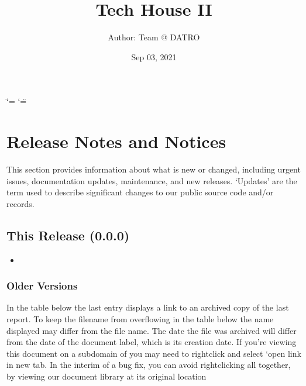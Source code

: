 \documentclass[letterpaper,10pt,openany,oneside,english]{sphinxmanual}
\title{Tech House II}
\date{Sep 03, 2021}
\author{Author: Team @ DATRO}
\begin{document}
\ifdefined\shorthandoff
  \ifnum\catcode`\=\string=\active\shorthandoff{=}\fi
  \ifnum\catcode`\"=\active{}\fi
\fi

\pagestyle{empty}
\sphinxmaketitle
\pagestyle{plain}
\sphinxtableofcontents
\pagestyle{normal}
\label{\detokenize{index::doc}}





\chapter{Release Notes and Notices}
\label{\detokenize{releasenotes:release-notes-and-notices}}\label{\detokenize{releasenotes::doc}}
\sphinxAtStartPar
This section provides information about what is new or changed, including urgent issues, documentation updates, maintenance, and new releases.
\sphinxhyphen{} ‘Updates’ are the term used to describe significant changes to our public source code and/or records.


\section{This Release (0.0.0)}
\label{\detokenize{releasenotes:this-release-0-0-0}}\begin{itemize}
\item {} 
\sphinxAtStartPar
{} \sphinxhyphen{} 

\end{itemize}


\subsection{Older Versions}
\label{\detokenize{releasenotes:older-versions}}
\sphinxAtStartPar
In the table below the last entry displays a link to an archived copy of the last report.
To keep the filename from overflowing in the table below the name displayed may differ from the file name.
The date the file was archived will differ from the date of the document label, which is its creation date.
If you’re viewing this document on a subdomain of  you may need to right\sphinxhyphen{}click and select ‘open link in new tab\textasciigrave{}.
In the interim of a bug fix, you can avoid right\sphinxhyphen{}clicking all together, by viewing our document library at its original location 
\end{document}
